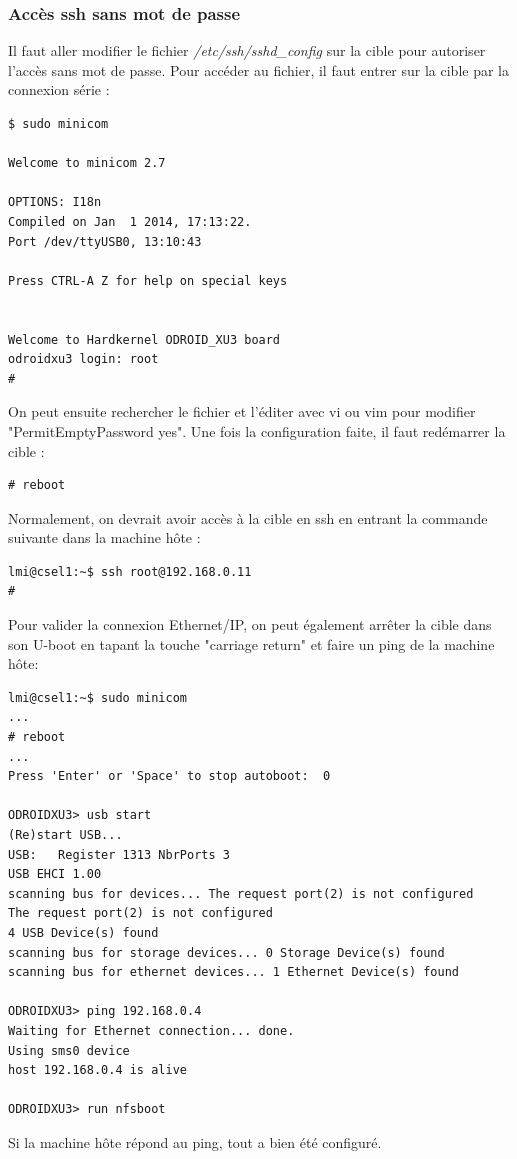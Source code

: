 \subsubsection{Accès ssh sans mot de passe}
Il faut aller modifier le fichier \textit{/etc/ssh/sshd\_config} sur la cible pour autoriser l’accès sans mot de passe. Pour accéder au fichier, il faut entrer sur la cible par la connexion série :
\begin{lstlisting}
$ sudo minicom

Welcome to minicom 2.7

OPTIONS: I18n 
Compiled on Jan  1 2014, 17:13:22.
Port /dev/ttyUSB0, 13:10:43

Press CTRL-A Z for help on special keys


Welcome to Hardkernel ODROID_XU3 board
odroidxu3 login: root
# 

\end{lstlisting}
On peut ensuite rechercher le fichier et l’éditer avec vi ou vim pour modifier "PermitEmptyPassword yes". Une fois la configuration faite, il faut redémarrer la cible :
\begin{lstlisting}
# reboot
\end{lstlisting}
Normalement, on devrait avoir accès à la cible en ssh en entrant la commande suivante dans la machine hôte :
\begin{lstlisting}
lmi@csel1:~$ ssh root@192.168.0.11
# 
\end{lstlisting}
Pour valider la connexion Ethernet/IP, on peut également arrêter la cible dans son U-boot en tapant la touche "carriage return" et faire un ping de la machine hôte:
\begin{lstlisting}
lmi@csel1:~$ sudo minicom
...
# reboot
...                                                      
Press 'Enter' or 'Space' to stop autoboot:  0       
                            
ODROIDXU3> usb start                                                            
(Re)start USB...                                                                
USB:   Register 1313 NbrPorts 3                                                 
USB EHCI 1.00                                                                   
scanning bus for devices... The request port(2) is not configured               
The request port(2) is not configured                                           
4 USB Device(s) found                                                           
scanning bus for storage devices... 0 Storage Device(s) found            
scanning bus for ethernet devices... 1 Ethernet Device(s) found          

ODROIDXU3> ping 192.168.0.4                                                     
Waiting for Ethernet connection... done.                                        
Using sms0 device                                                               
host 192.168.0.4 is alive

ODROIDXU3> run nfsboot
\end{lstlisting}
Si la machine hôte répond au ping, tout a bien été configuré.

